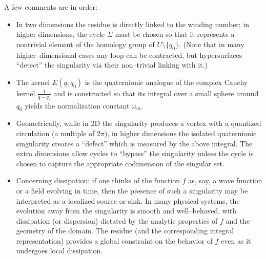 \documentclass[12pt]{article}
\begin{document}
A few comments are in order:
\begin{itemize}
  \item In two dimensions the residue is directly linked to the winding number; in higher dimensions, the cycle \(\Sigma\) must be chosen so that it represents a nontrivial element of the homology group of \(U\setminus\{q_0\}\). (Note that in many higher–dimensional cases any loop can be contracted, but hypersurfaces “detect” the singularity via their non–trivial linking with it.)
  \item The kernel \(E(q,q_0)\) is the quaternionic analogue of the complex Cauchy kernel \(\frac{1}{q-q_0}\) and is constructed so that its integral over a small sphere around \(q_0\) yields the normalization constant \(\omega_m\).
  \item Geometrically, while in 2D the singularity produces a vortex with a quantized circulation (a multiple of \(2\pi\)), in higher dimensions the isolated quaternionic singularity creates a “defect” which is measured by the above integral. The extra dimensions allow cycles to “bypass” the singularity unless the cycle is chosen to capture the appropriate codimension of the singular set.
  \item Concerning dissipation: if one thinks of the function \(f\) as, say, a wave function or a field evolving in time, then the presence of such a singularity may be interpreted as a localized source or sink. In many physical systems, the evolution away from the singularity is smooth and well–behaved, with dissipation (or dispersion) dictated by the analytic properties of \(f\) and the geometry of the domain. The residue (and the corresponding integral representation) provides a global constraint on the behavior of \(f\) even as it undergoes local dissipation.
\end{itemize}
\end{document}

